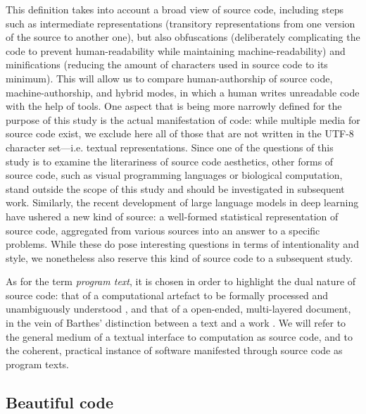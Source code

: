 This definition takes into account a broad view of source code, including steps such as intermediate representations (transitory representations from one version of the source to another one), but also obfuscations (deliberately complicating the code to prevent human-readability while maintaining machine-readability) and minifications (reducing the amount of characters used in source code to its minimum). This will allow us to compare human-authorship of source code, machine-authorship, and hybrid modes, in which a human writes unreadable code with the help of tools. One aspect that is being more narrowly defined for the purpose of this study is the actual manifestation of code: while multiple media for source code exist, we exclude here all of those that are not written in the UTF-8 character set—i.e. textual representations. Since one of the questions of this study is to examine the literariness of source code aesthetics, other forms of source code, such as visual programming languages or biological computation, stand outside the scope of this study and should be investigated in subsequent work. Similarly, the recent development of large language models in deep learning have ushered a new kind of source: a well-formed statistical representation of source code, aggregated from various sources into an answer to a specific problems. While these do pose interesting questions in terms of intentionality and style, we nonetheless also reserve this kind of source code to a subsequent study.

As for the term \emph{program text}, it is chosen in order to highlight the dual nature of source code: that of a computational artefact to be formally processed and unambiguously understood \citep{detienne_software_2001}, and that of a open-ended, multi-layered document, in the vein of Barthes' distinction between a text and a work \citep{barthes_bruissement_1984}. We will refer to the general medium of a textual interface to computation as source code, and to the coherent, practical instance of software manifested through source code as program texts.

\subsection{Beautiful code}
\label{subsec:beautiful-code}

